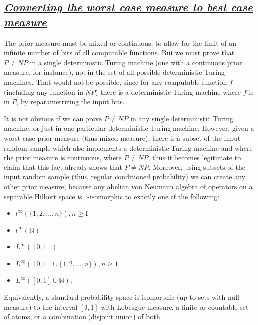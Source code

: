 \documentclass[11pt,a4paper]{report}
\begin{document}
\hypertarget{converting-the-worst-case-measure-to-best-case-measure}{%
\subsection{\texorpdfstring{\href{}{\emph{Converting the worst case
measure to best case
measure}}}{Converting the worst case measure to best case measure}}\label{converting-the-worst-case-measure-to-best-case-measure}}

The prior measure must be mixed or continuous, to allow for the limit of
an infinite number of bits of all computable functions. But we must
prove that \(P\neq NP\) in a single deterministic Turing machine (one
with a continuous prior measure, for instance), not in the set of all
possible deterministic Turing machines. That would not be possible,
since for any computable function \(f\) (including any function in
\(NP\)) there is a deterministic Turing machine where \(f\) is in \(P\),
by reparametrizing the input bits.

It is not obvious if we can prove \(P\neq NP\) in any single
deterministic Turing machine, or just in one particular deterministic
Turing machine. However, given a worst case prior measure (thus mixed
measure), there is a subset of the input random sample which also
implements a deterministic Turing machine and where the prior measure is
continuous, where \(P\neq NP\), thus it becomes legitimate to claim that
this fact already shows that \(P\neq NP\). Moreover, using subsets of
the input random sample (thus, regular conditioned probability) we can
create any other prior measure, because any abelian von Neumann algebra
of operators on a separable Hilbert space is *-isomorphic to exactly one
of the following:

\begin{itemize}
\item
  \(l^\infty(\{ 1 , 2 , ... , n \} ) , n \geq 1\)
\item
  \(l^\infty(\mathbb{N})\)
\item
  \(L^\infty([0,1])\)
\item
  \(L^\infty([0,1]\cup\{ 1 , 2 , ... , n \} ) , n \geq 1\)
\item
  \(L^\infty([0,1]\cup \mathbb{N})\).
\end{itemize}

Equivalently, a standard probability space is isomorphic (up to sets
with null measure) to the interval \([0,1]\) with Lebesgue measure, a
finite or countable set of atoms, or a combination (disjoint union) of
both.
\end{document}
